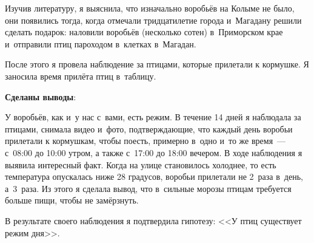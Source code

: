 Изучив литературу, я выяснила, что изначально воробьёв на Колыме не было, они появились тогда, когда отмечали тридцатилетие города и~Магадану решили сделать подарок: наловили воробьёв (несколько сотен) в~Приморском крае и~отправили птиц пароходом в~клетках в~Магадан.

После этого я провела наблюдение за птицами, которые прилетали к кормушке. Я заносила время прилёта птиц в~таблицу.

\textbf{Сделаны выводы}:

У воробьёв, как и~у нас с~вами, есть режим. В течение 14 дней я наблюдала за птицами, снимала видео и~фото, подтверждающие, что каждый день воробьи прилетали к кормушкам, чтобы поесть, примерно в~одно и~то же время~--- с~08:00 до 10:00 утром, а также с~17:00 до 18:00 вечером. В ходе наблюдения я выявила интересный факт. Когда на улице становилось холоднее, то есть температура опускалась ниже 28 градусов, воробьи прилетали не 2~раза в~день, а~3~раза. Из этого я сделала вывод, что в~сильные морозы птицам требуется больше пищи, чтобы не замёрзнуть.

В результате своего наблюдения я подтвердила гипотезу: <<У птиц существует режим дня>>.
